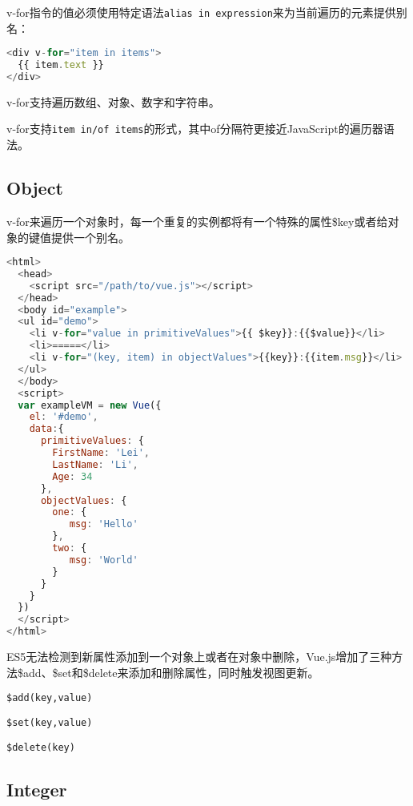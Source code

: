 v-for指令的值必须使用特定语法\texttt{alias in expression}来为当前遍历的元素提供别名：


\begin{lstlisting}[language=JavaScript]
<div v-for="item in items">
  {{ item.text }}
</div>
\end{lstlisting}

v-for支持遍历数组、对象、数字和字符串。




v-for支持\texttt{item in/of items}的形式，其中of分隔符更接近JavaScript的遍历器语法。

\subsection{Object}

v-for来遍历一个对象时，每一个重复的实例都将有一个特殊的属性\$key或者给对象的键值提供一个别名。



\begin{lstlisting}[language=JavaScript]
<html>
  <head>
    <script src="/path/to/vue.js"></script>
  </head>
  <body id="example">
  <ul id="demo">
    <li v-for="value in primitiveValues">{{ $key}}:{{$value}}</li>
    <li>=====</li>
    <li v-for="(key, item) in objectValues">{{key}}:{{item.msg}}</li>
  </ul>
  </body>
  <script>
  var exampleVM = new Vue({
    el: '#demo',
    data:{
      primitiveValues: {
        FirstName: 'Lei',
        LastName: 'Li',
        Age: 34
      },
      objectValues: {
        one: {
           msg: 'Hello'
        },
        two: {
           msg: 'World'
        }
      }
    }
  })
  </script>
</html>
\end{lstlisting}

ES5无法检测到新属性添加到一个对象上或者在对象中删除，Vue.js增加了三种方法\$add、\$set和\$delete来添加和删除属性，同时触发视图更新。

\begin{compactitem}
\item \texttt{\$add(key,value)}
\item \texttt{\$set(key,value)}
\item \texttt{\$delete(key)}
\end{compactitem}



\subsection{Integer}

